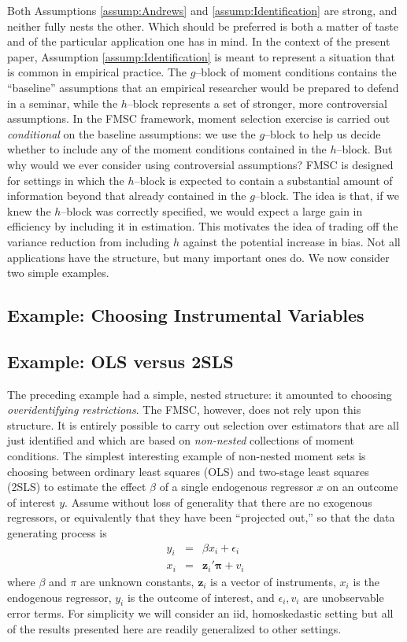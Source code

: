 \documentclass[12pt]{article}
\theoremstyle{definition}
\begin{document}
Both Assumptions \ref{assump:Andrews} and \ref{assump:Identification} are strong, and neither fully nests the other. Which should be preferred is both a matter of taste and of the particular application one has in mind. In the context of the present paper, Assumption \ref{assump:Identification} is meant to represent a situation that is common in empirical practice. The $g$--block of moment conditions contains the ``baseline'' assumptions that an empirical researcher would be prepared to defend in a seminar, while the $h$--block represents a set of stronger, more controversial assumptions. In the FMSC framework, moment selection exercise is carried out \emph{conditional} on the baseline assumptions: we use the $g$--block to help us decide whether to include any of the moment conditions contained in the $h$--block. But why would we ever consider using controversial assumptions? FMSC is designed for settings in which the $h$--block is expected to contain a substantial amount of information beyond that already contained in the $g$--block. The idea is that, if we knew the $h$--block was correctly specified, we would expect a large gain in efficiency by including it in estimation. This motivates the idea of trading off the variance reduction from including $h$ against the potential increase in bias. Not all applications have the structure, but many important ones do. We now consider two simple examples. 


\subsection{Example: Choosing Instrumental Variables}

\subsection{Example: OLS versus 2SLS}
The preceding example had a simple, nested structure: it amounted to choosing \emph{overidentifying restrictions}. The FMSC, however, does not rely upon this structure. It is entirely possible to carry out selection over estimators that are all just identified and which are based on \emph{non-nested} collections of moment conditions. The simplest interesting example of non-nested moment sets is choosing between ordinary least squares (OLS) and two-stage least squares (2SLS) to estimate the effect $\beta$ of a single endogenous regressor $x$ on an outcome of interest $y$. Assume without loss of generality that there are no exogenous regressors, or equivalently that they have been ``projected out,'' so that the data generating process is
    \begin{eqnarray}
			y_{i} &=& \beta x_{i}  + \epsilon_{i}\\
	x_{i} &=& \mathbf{z}_{i}' \boldsymbol{\pi} + v_{i}
	\end{eqnarray}
where $\beta$ and $\pi$ are unknown constants, $\mathbf{z}_i$ is a vector of instruments, $x_i$ is the endogenous regressor, $y_i$ is the outcome of interest, and $\epsilon_i, v_i$ are unobservable error terms. For simplicity we will consider an iid, homoskedastic setting but all of the results presented here are readily generalized to other settings.	
\end{document}
